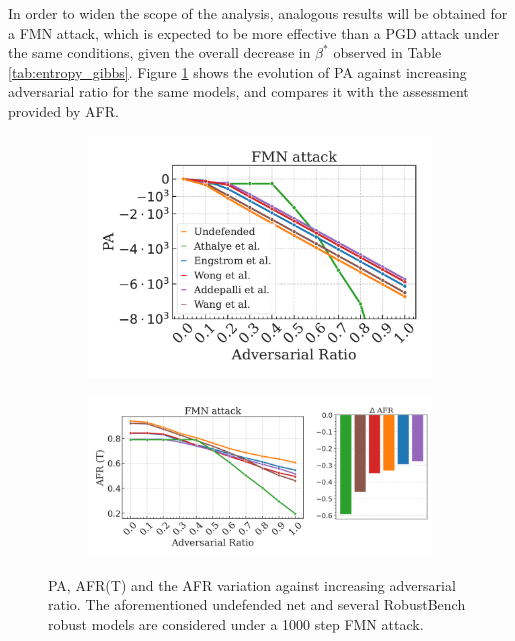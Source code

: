 In order to widen the scope of the analysis, analogous results will be obtained for
a FMN attack, which is expected to be more effective than a PGD attack under 
the same conditions, given the overall decrease in $\beta^{*}$ observed 
in Table \ref{tab:entropy_gibbs}.
Figure \ref{fig:adv_fmn_pa_afr} shows the evolution of PA against 
increasing adversarial ratio for the same models, and compares
it with the assessment provided by AFR.


\begin{figure}[H]
    \centering
    \begin{subfigure}[b]{0.39\textwidth}
        \centering
        \includegraphics[width=\textwidth]{img/results_discussion/adversarial/FMN.pdf}
    \end{subfigure}
    \hfill
    \begin{subfigure}[b]{0.59\textwidth}
        \centering
        \includegraphics[width=\textwidth]{img/results_discussion/adversarial/FMN_1000_AFR_true.png}
    \end{subfigure}
    \caption{PA, AFR(T) and the AFR variation against increasing adversarial ratio. 
    The aforementioned undefended net and several RobustBench robust models are considered 
    under a 1000 step FMN attack.}
    \label{fig:adv_fmn_pa_afr}
\end{figure}



